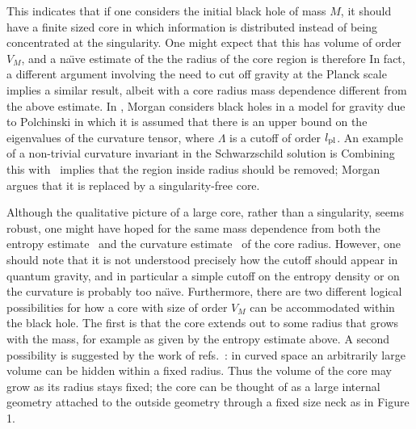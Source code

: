 This indicates that if one considers the initial black hole of mass $M$,
it  should have a finite sized core
in which information is distributed instead of being concentrated at
the singularity.  One might expect that this has volume of order $V_M$,
and a  na\"\i ve estimate of the the radius of the core region is therefore
%
\eqn{}
%
In fact, a different argument
involving the need to cut off gravity at the Planck scale implies a
similar
result, albeit with a core radius mass dependence different
from the above estimate.
In , Morgan considers black holes in a
model for gravity due to Polchinski in which it is
assumed that there is an upper bound on the eigenvalues of the
curvature tensor,
%
\eqn{}
%
where $\Lambda$ is a cutoff of order $l_{\rm pl}$.
An example of a non-trivial curvature invariant in the Schwarzschild
solution is
%
\eqn{}
%
Combining this with \curvbd\ implies that the region inside
radius
%
\eqn{}
%
should be removed;  Morgan argues that it is
replaced by a singularity-free core.

Although the qualitative picture  of a large core, rather than a
singularity, seems robust, one might have hoped for the same mass dependence
from both the entropy estimate \ebound\ and the curvature estimate \cbound\
of the core
radius.  However, one
should note that it is not understood precisely how the cutoff should
appear in quantum gravity, and in particular a simple cutoff on
the entropy density or on the curvature is probably too na\"\i ve.
Furthermore, there are two different logical possibilities for how a core
with size of order $V_M$ can be accommodated within the black hole.  The first
is that the core extends out to some radius that grows with the mass, for
example as given by the entropy estimate above. A second possibility
is suggested by the work of refs.~\refs{\BDDO,\DXBH}:
in curved space an arbitrarily large volume can be hidden within a fixed
radius.  Thus the volume of the core may grow as its radius stays fixed;
the core
can be thought of as a large internal geometry
attached to the outside geometry through a
fixed size neck as in Figure 1.

